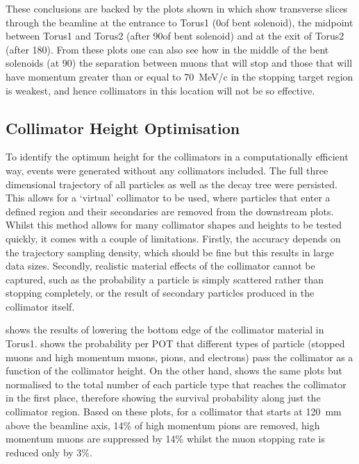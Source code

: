 \FigOptimMuBeamCollimTransverseSep
These conclusions are backed by the plots shown in  which show transverse slices through the beamline at the entrance to Torus1 (0\degree of bent solenoid), the midpoint between Torus1 and Torus2 (after 90\degree of bent solenoid) and at the exit of Torus2 (after 180\degree).
From these plots one can also see how in the middle of the bent solenoids (at 90\degree) the separation between muons that will stop and those that will have momentum greater than or equal to 70~MeV/c in the stopping target region is weakest, and hence collimators in this location will not be so effective.

\subsection{Collimator Height Optimisation}
\FigOptimMuBeamCollimTorusOne
To identify the optimum height for the collimators in a computationally efficient way, events were generated without any collimators included.
The full three dimensional trajectory of all particles as well as the decay tree were persisted.
This allows for a `virtual' collimator to be used, where particles that enter a defined region and their secondaries are removed from the downstream plots.
Whilst this method allows for many collimator shapes and heights to be tested quickly, it comes with a couple of limitations.
Firstly, the accuracy depends on the trajectory sampling density, which should be fine but this results in large data sizes.
Secondly, realistic material effects of the collimator cannot be captured, such as the probability a particle is simply scattered rather than stopping completely, or the result of secondary particles produced in the collimator itself.
\FigOptimMuBeamCollimTorusTwoFraction
\FigOptimMuBeamCollimTorusTwoContours
\FigOptimMuBeamCollimMuonPathsWColl

 shows the results of lowering the bottom edge of the collimator material in Torus1.
 shows the probability per \ac{POT} that different types of particle (stopped muons and high momentum muons, pions, and electrons) pass the collimator as a function of the collimator height.
On the other hand,  shows the same plots but normalised to the total number of each particle type that reaches the collimator in the first place, therefore showing the survival probability along just the collimator region.
Based on these plots, for a collimator that starts at 120~mm above the beamline axis, 14\% of high momentum pions are removed, high momentum muons are suppressed by 14\% whilst the muon stopping rate is reduced only by 3\%.

